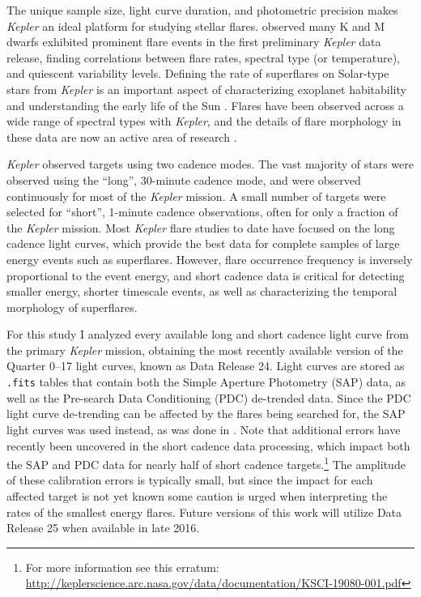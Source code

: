 \documentclass[twocolumn]{aastex6}
\newcommand{\Kepler}{\textsl{Kepler}\xspace}
\begin{document}
The unique sample size, light curve duration, and photometric precision makes \Kepler an ideal platform for studying stellar flares. \citep{walkowicz2011} observed many K and M dwarfs exhibited prominent flare events in the first preliminary \Kepler data release, finding correlations between flare rates, spectral type (or temperature), and quiescent variability levels. Defining the rate of superflares on Solar-type stars from \Kepler is an important aspect of characterizing exoplanet habitability and understanding the early life of the Sun \citep{maehara2015}. Flares have been observed across a wide range of spectral types with \Kepler \citep{balona2015}, and the details of flare morphology in these data are now an active area of research \citep[e.g.][]{davenport2014b, pugh2015}.


\Kepler observed targets using two cadence modes. The vast majority of stars were observed using the ``long'', 30-minute cadence mode, and were observed continuously for most of the \Kepler mission. A small number of targets were selected for ``short'', 1-minute cadence observations, often for only a fraction of the \Kepler mission. Most \Kepler flare studies to date have focused on the long cadence light curves, which provide the best data for complete samples of large energy events such as superflares. However, flare occurrence frequency is inversely proportional to the event energy, and short cadence data is critical for detecting smaller energy, shorter timescale events, as well as characterizing the temporal morphology of superflares.


For this study I analyzed every available long and short cadence light curve from the primary \Kepler mission, obtaining the most recently available version of the Quarter 0--17 light curves, known as Data Release 24. Light curves are stored as {\tt .fits} tables that contain both the Simple Aperture Photometry (SAP) data, as well as the Pre-search Data Conditioning (PDC) de-trended data. Since the PDC light curve de-trending can be affected by the flares being searched for, the SAP light curves was used instead, as was done in \citet{balona2015}. Note that additional errors have recently been uncovered in the short cadence data processing, which impact both the SAP and PDC data for nearly half of short cadence targets.\footnote{For more information see this erratum:\\ \url{http://keplerscience.arc.nasa.gov/data/documentation/KSCI-19080-001.pdf}}
The amplitude of these calibration errors is typically small, but since the impact for each affected target is not yet known some caution is urged when interpreting the rates of the smallest energy flares. Future versions of this work will utilize Data Release 25 when available in late 2016.
\end{document}
